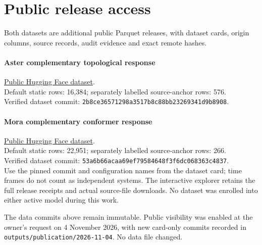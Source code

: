 \section{Public release access}
Both datasets are additional public Parquet releases, with dataset cards,
origin columns, source records, audit evidence and exact remote hashes.
\paragraph{Aster complementary topological response}\href{https://huggingface.co/datasets/AmelieSchreiber/GRH-Aster-TopoResponse-20261104}{Public Hugging Face dataset}.\\
Default static rows: 16,384; separately labelled source-anchor rows: 576.\\
Verified dataset commit: \texttt{2b8ce36571298a3517b8c88bb23269341d9b8908}.\\
\paragraph{Mora complementary conformer response}\href{https://huggingface.co/datasets/AmelieSchreiber/GRH-Mora-ConformerResponse-20261104}{Public Hugging Face dataset}.\\
Default static rows: 22,951; separately labelled source-anchor rows: 266.\\
Verified dataset commit: \texttt{53a6b66acaa69ef79584648f3f6dc068363c4837}.\\
Use the pinned commit and configuration names from the dataset card; time
frames do not count as independent systems. The interactive explorer retains
the full release receipts and actual source-file downloads. No dataset was
enrolled into either active model during this work.

The data commits above remain immutable. Public visibility was enabled at the
owner's request on 4 November 2026, with new card-only commits recorded in
\texttt{outputs/publication/2026-11-04}. No data file changed.
